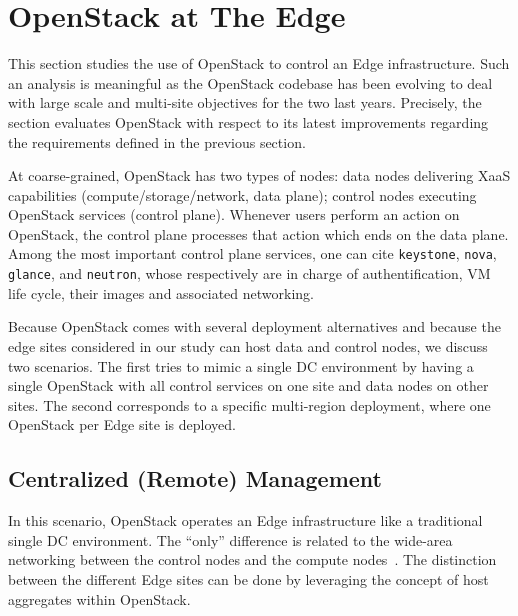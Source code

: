 \section{OpenStack at The Edge}
\label{sec:system_design_considerations}
%
This section studies the use of OpenStack to control an Edge
infrastructure.  Such an analysis is meaningful as the OpenStack
codebase has been evolving to deal with large scale and multi-site
objectives for the two last years.  Precisely, the section evaluates
OpenStack with respect to its latest improvements regarding the requirements
defined in the previous section.


At coarse-grained, OpenStack has two types of nodes: data nodes
delivering XaaS capabilities (compute/storage/network, \ie data
plane); control nodes executing OpenStack services (\ie control
plane). Whenever users perform an action on OpenStack, the control
plane processes that action which ends on the data plane.  Among the
most important control plane services, one can cite \verb|keystone|,
\verb|nova|, \verb|glance|, and \verb|neutron|, whose respectively are
in charge of authentification, VM life cycle, their images and
associated networking.

Because OpenStack comes with several deployment alternatives and
because the edge sites considered in our study can host data and
control nodes, we discuss two scenarios. The first tries to mimic a
single DC environment by having a single OpenStack with all control
services on one site and data nodes on other sites.  The second
corresponds to a specific multi-region deployment, where one OpenStack
per Edge site is deployed.

\subsection{Centralized (Remote) Management}
\label{subsec:centralized_os}
In this scenario, OpenStack operates an Edge infrastructure
like a traditional single DC environment. %
The ``only'' difference is
related to the wide-area networking between the control nodes
and the compute nodes~\cite{www:openstack-wanwide}. The distinction between the different Edge
sites can be done by leveraging the concept of host aggregates
within OpenStack.

